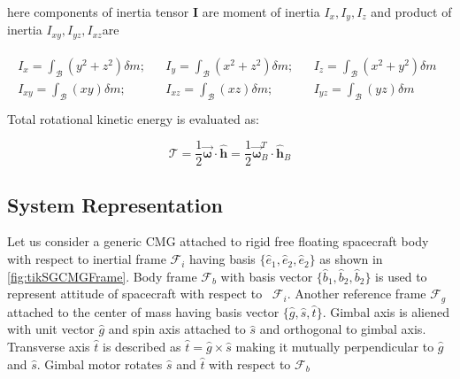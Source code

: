 here components of inertia tensor $\displaystyle \mathbf{I}$ are moment of inertia $\displaystyle I_{x} ,I_{y} ,I_{z}$ and product of inertia $\displaystyle I_{xy} ,I_{yz} ,I_{xz}$are


\begin{gather*}
 \begin{aligned}
I_{x} =\int _{\mathcal{B}}\left( y^{2} +z^{2}\right) \delta m; & & I_{y} =\int _{\mathcal{B}}\left( x^{2} +z^{2}\right) \delta m; & & I_{z} =\int _{\mathcal{B}}\left( x^{2} +y^{2}\right) \delta m\\
I_{xy} =\int _{\mathcal{B}}( xy) \delta m; & & I_{xz} =\int _{\mathcal{B}}( xz) \delta m; & & I_{yz} =\int _{\mathcal{B}}( yz) \delta m
\end{aligned} \ \ \\
\end{gather*}
Total rotational kinetic energy is evaluated as:



\begin{equation}
\mathcal{T} =\frac{1}{2}\vec{\mathbf{\omega }} \cdotp \hat{\mathbf{h}} =\frac{1}{2}\vec{\mathbf{\omega }}^{T}_{B} \cdotp \hat{\mathbf{h}}_{B}
\end{equation}


\subsection{System Representation}
Let us consider a generic CMG attached to rigid free floating spacecraft body with respect to inertial frame $\displaystyle \mathcal{F}_{i}$ having basis $\displaystyle \{\hat{e}_{1} ,\hat{e}_{2} ,\hat{e}_{2}\}$ as shown in \autoref{fig:tikSGCMGFrame}. Body frame $\displaystyle \mathcal{F}_{b}$ with basis vector $\displaystyle \{\hat{b}_{1} ,\hat{b}_{2} ,\hat{b}_{2}\}$ is used to represent attitude of spacecraft with respect to \ $\displaystyle \mathcal{F}_{i}$. Another reference frame $\displaystyle \mathcal{F}_{g}$ attached to the center of mass having basis vector $\displaystyle \{\hat{g} ,\hat{s} ,\hat{t}\}$. Gimbal axis is aliened with unit vector $\displaystyle \hat{g}$ and spin axis attached to $\displaystyle \hat{s}$ and orthogonal to gimbal axis. Transverse axis $\displaystyle \hat{t}$ is described as $\displaystyle \hat{t} =\hat{g} \times \hat{s}$ making it mutually perpendicular to $\displaystyle \hat{g}$ and $\displaystyle \hat{s}$. Gimbal motor rotates $\displaystyle \hat{s}$ and $\displaystyle \hat{t}$ with respect to $\displaystyle \mathcal{F}_{b}$

